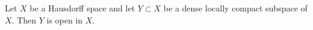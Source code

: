 Let $X$ be a Hausdorff space and let $Y \subset X$ be a dense locally compact subspace of $X$. Then $Y$ is open in $X$.
